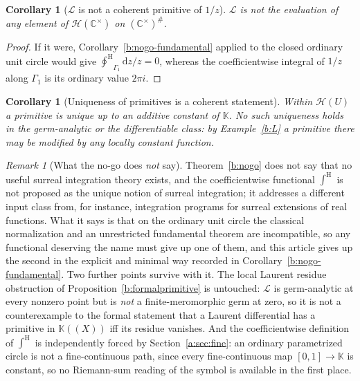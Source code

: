 \documentclass[11pt,a4paper]{article}
\numberwithin{equation}{section}
\newtheorem{corollary}[theorem]{Corollary}
\theoremstyle{definition}
\theoremstyle{remark}
\newtheorem{remark}[theorem]{Remark}
\theoremstyle{plain}
\newcommand{\K}{\mathbb K}
\newcommand{\CC}{\mathbb C}
\newcommand{\halo}[1]{#1^{\#}}
\newcommand{\Hc}{\mathcal H}
\newcommand{\intH}{{\int^{\mathrm H}}}
\newcommand{\ointH}{{\oint^{\mathrm H}}}
\newcommand{\dd}{\mathrm d}
\begin{document}
\begin{corollary}[$\mathcal L$ is not a coherent primitive of $1/z$]
\label{b:log-not-coherent}
$\mathcal L$ is not the evaluation of any element of
$\Hc(\CC^{\times})$ on $\halo{(\CC^{\times})}$.
\end{corollary}

\begin{proof}
If it were, Corollary~\ref{b:nogo-fundamental} applied to the closed
ordinary unit circle would give
$\ointH_{\Gamma_1}\dd z/z=0$, whereas the coefficientwise integral of
$1/z$ along $\Gamma_1$ is its ordinary value $2\pi i$.
\end{proof}

\begin{corollary}[Uniqueness of primitives is a coherent statement]
\label{b:primitive-uniqueness-scope}
Within $\Hc(U)$ a primitive is unique up to an additive constant of $\K$.
No such uniqueness holds in the germ-analytic or the differentiable class:
by Example~\ref{b:L} a primitive there may be modified by any locally
constant function.
\end{corollary}

\begin{remark}[What the no-go does \emph{not} say]
\label{b:nogo-scope}
Theorem~\ref{b:nogo} does not say that no useful surreal integration
theory exists, and the coefficientwise functional $\intH$ is not proposed
as the unique notion of surreal integration; it addresses a different
input class from, for instance, integration programs for surreal
extensions of real functions. What it says is that on the ordinary unit
circle the classical normalization and an unrestricted fundamental theorem
are incompatible, so any functional deserving the name must give up one of
them, and this article gives up the second in the explicit and minimal way
recorded in Corollary~\ref{b:nogo-fundamental}. Two further points
survive with it. The local Laurent residue obstruction of
Proposition~\ref{b:formalprimitive} is untouched: $\mathcal L$ is
germ-analytic at every nonzero point but is \emph{not} a
finite-meromorphic germ at zero, so it is not a counterexample to the
formal statement that a Laurent differential has a primitive in
$\K((X))$ iff its residue vanishes. And the coefficientwise definition of
$\intH$ is independently forced by Section~\ref{a:sec:fine}: an ordinary
parametrized circle is not a fine-continuous path, since every
fine-continuous map $[0,1]\to\K$ is constant, so no Riemann-sum reading of
the symbol is available in the first place.
\end{remark}
\end{document}
